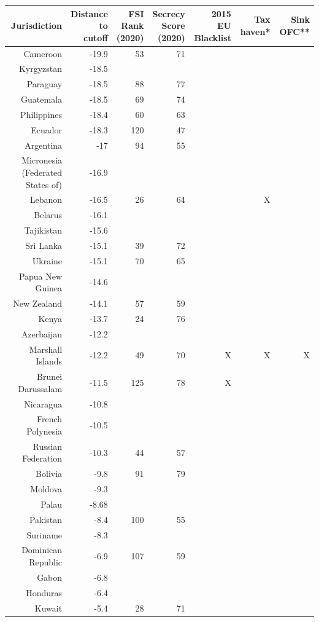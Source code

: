 \begin{tabular}{rrrrrrr}
\toprule
Jurisdiction&\shortstack{Distance \\ to \\ cutoff}&\shortstack{FSI \\ Rank \\ (2020)}&\shortstack{Secrecy \\ Score \\ (2020)}&\shortstack{2015 \\ EU Blacklist}&Tax haven* & Sink OFC**\\
\midrule
Cameroon&-19.9&53&71&&&\\
Kyrgyzstan&-18.5&&&&&\\
Paraguay&-18.5&88&77&&&\\
Guatemala&-18.5&69&74&&&\\
Philippines&-18.4&60&63&&&\\
Ecuador&-18.3&120&47&&&\\
Argentina&-17&94&55&&&\\
Micronesia (Federated States of)&-16.9&&&&&\\
Lebanon&-16.5&26&64&&X&\\
Belarus&-16.1&&&&&\\
Tajikistan&-15.6&&&&&\\
Sri Lanka&-15.1&39&72&&&\\
Ukraine&-15.1&70&65&&&\\
Papua New Guinea&-14.6&&&&&\\
New Zealand&-14.1&57&59&&&\\
Kenya&-13.7&24&76&&&\\
Azerbaijan&-12.2&&&&&\\
Marshall Islands&-12.2&49&70&X&X&X\\
Brunei Darussalam&-11.5&125&78&X&&\\
Nicaragua&-10.8&&&&&\\
French Polynesia&-10.5&&&&&\\
Russian Federation&-10.3&44&57&&&\\
Bolivia&-9.8&91&79&&&\\
Moldova&-9.3&&&&&\\
Palau&-8.68&&&&&\\
Pakistan&-8.4&100&55&&&\\
Suriname&-8.3&&&&&\\
Dominican Republic&-6.9&107&59&&&\\
Gabon&-6.8&&&&&\\
Honduras&-6.4&&&&&\\
Kuwait&-5.4&28&71&&&\\

\end{tabular}
